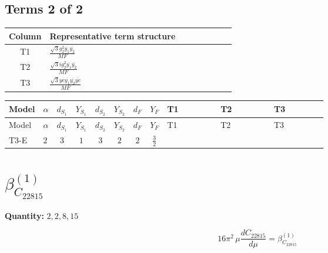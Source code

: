 \documentclass[8pt]{article}
\begin{document}
\begin{landscape}
\subsection*{Terms 2 of 2}
\begin{center}
\begin{tabular}{@{}c >{\raggedright\arraybackslash}p{0.82\linewidth}@{}}
\toprule
Column & Representative term structure \\
\midrule
T1 & \(\displaystyle \frac{\sqrt{3} g_{2}^{2} \overline{y_{1}} \overline{y_{2}}}{MF}\) \\
\midrule
T2 & \(\displaystyle \frac{\sqrt{3} i g_{2}^{2} \overline{y_{1}} \overline{y_{2}}}{MF}\) \\
\midrule
T3 & \(\displaystyle \frac{\sqrt{3} ye \overline{y_{1}} \overline{y_{2}} \overline{ye}}{MF}\) \\
\midrule
\bottomrule
\end{tabular}
\end{center}
\smallskip
\tiny
\begin{longtable}{@{}llcccccc >{\raggedright\arraybackslash}p{0.21\linewidth} >{\raggedright\arraybackslash}p{0.21\linewidth} >{\raggedright\arraybackslash}p{0.21\linewidth}@{}}
\toprule
Model & $\alpha$ & $d_{S_1}$ & $Y_{S_1}$ & $d_{S_2}$ & $Y_{S_2}$ & $d_F$ & $Y_F$ & T1 & T2 & T3 \\
\midrule
\endfirsthead
\toprule
Model & $\alpha$ & $d_{S_1}$ & $Y_{S_1}$ & $d_{S_2}$ & $Y_{S_2}$ & $d_F$ & $Y_F$ & T1 & T2 & T3 \\
\midrule
\endhead
T3-E & $2$ & $3$ & $1$ & $3$ & $2$ & $2$ & $\frac{3}{2}$ & \scriptsize\adjustbox{max width=\linewidth}{$\begin{gathered} \frac{11 \sqrt{3} g_{2}^{2} \overline{y_{1}} \overline{y_{2}}}{8 MF}\end{gathered}$} & \scriptsize\adjustbox{max width=\linewidth}{$\begin{gathered} - \frac{\sqrt{3} i g_{2}^{2} \overline{y_{1}} \overline{y_{2}}}{6 MF}\end{gathered}$} & \scriptsize\adjustbox{max width=\linewidth}{$\begin{gathered} - \frac{\sqrt{3} ye \overline{y_{1}} \overline{y_{2}} \overline{ye}}{12 MF}\end{gathered}$} \\
\midrule
\bottomrule
\end{longtable}
\clearpage
\section*{$\beta_{C_{22815}}^{(1)}$}
\noindent\textbf{Quantity: }$\mathrm{2,2,8,15}$\par\smallskip
\[16\pi^2\,\mu\frac{d C_{22815}}{d\mu}=\beta_{C_{22815}}^{(1)}\]

\end{landscape}
\end{document}
